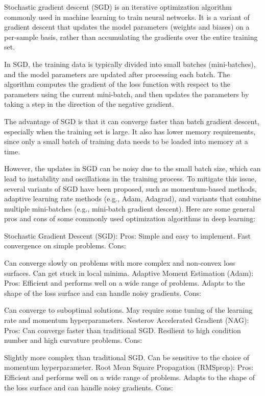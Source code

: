 Stochastic gradient descent (SGD) is an iterative optimization algorithm commonly used in machine learning to train neural networks. It is a variant of gradient descent that updates the model parameters (weights and biases) on a per-sample basis, rather than accumulating the gradients over the entire training set.

In SGD, the training data is typically divided into small batches (mini-batches), and the model parameters are updated after processing each batch. The algorithm computes the gradient of the loss function with respect to the parameters using the current mini-batch, and then updates the parameters by taking a step in the direction of the negative gradient.

The advantage of SGD is that it can converge faster than batch gradient descent, especially when the training set is large. It also has lower memory requirements, since only a small batch of training data needs to be loaded into memory at a time.

However, the updates in SGD can be noisy due to the small batch size, which can lead to instability and oscillations in the training process. To mitigate this issue, several variants of SGD have been proposed, such as momentum-based methods, adaptive learning rate methods (e.g., Adam, Adagrad), and variants that combine multiple mini-batches (e.g., mini-batch gradient descent).
Here are some general pros and cons of some commonly used optimization algorithms in deep learning:

Stochastic Gradient Descent (SGD):
Pros:
Simple and easy to implement.
Fast convergence on simple problems.
Cons:

Can converge slowly on problems with more complex and non-convex loss surfaces.
Can get stuck in local minima.
Adaptive Moment Estimation (Adam):
Pros:
Efficient and performs well on a wide range of problems.
Adapts to the shape of the loss surface and can handle noisy gradients.
Cons:

Can converge to suboptimal solutions.
May require some tuning of the learning rate and momentum hyperparameters.
Nesterov Accelerated Gradient (NAG):
Pros:
Can converge faster than traditional SGD.
Resilient to high condition number and high curvature problems.
Cons:

Slightly more complex than traditional SGD.
Can be sensitive to the choice of momentum hyperparameter.
Root Mean Square Propagation (RMSprop):
Pros:
Efficient and performs well on a wide range of problems.
Adapts to the shape of the loss surface and can handle noisy gradients.
Cons:

